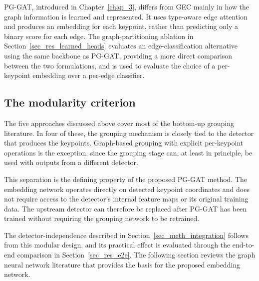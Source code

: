 PG-GAT, introduced in Chapter~\ref{chap_3},
differs from GEC mainly in how the graph information is learned and represented.
It uses type-aware edge attention and produces an embedding for each keypoint,
rather than predicting only a binary score for each edge.
The graph-partitioning ablation in Section~\ref{sec_res_learned_heads}
evaluates an edge-classification alternative using the same backbone as PG-GAT,
providing a more direct comparison between the two formulations,
and is used to evaluate the choice of a per-keypoint embedding over a per-edge classifier.

\subsection{The modularity criterion}
\label{sec_lit_grouping_modularity_criterion}

The five approaches discussed above cover most of the bottom-up grouping literature.
In four of these, the grouping mechanism is closely tied to the detector that produces the keypoints.
Graph-based grouping with explicit per-keypoint operations is the exception,
since the grouping stage can, at least in principle, be used with outputs from a different detector.

This separation is the defining property of the proposed PG-GAT method.
The embedding network operates directly on detected keypoint coordinates
and does not require access to the detector's internal feature maps or its original training data.
The upstream detector can therefore be replaced after PG-GAT has been trained
without requiring the grouping network to be retrained.

The detector-independence described in Section~\ref{sec_meth_integration} follows from this modular design,
and its practical effect is evaluated through the end-to-end comparison in Section~\ref{sec_res_e2e}.
The following section reviews the graph neural network literature
that provides the basis for the proposed embedding network.